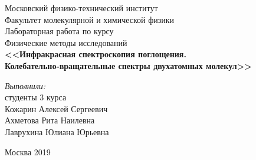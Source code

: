 \begin{titlepage}
\begin{center} 
 
\large Московский физико-технический институт\\
Факультет молекулярной и химической физики\\
\vspace{7cm}
\Large Лабораторная работа 
по курсу \\ Физические методы исследований\\
\textbf{\Huge <<Инфракрасная спектроскопия поглощения.\\
	Колебательно-вращательные спектры
	двухатомных молекул>>}\\
\end{center} 

\vspace{4cm}
{\par \raggedleft \large \emph{Выполнили:}\\ студенты 3 курса \\ Кожарин Алексей Сергеевич \\ Ахметова Рита Наилевна \\ Лаврухина Юлиана Юрьевна \par}
\begin{center}
\vfill Москва 2019
\end{center}
\end{titlepage}
\newpage
\setcounter{page}{2}